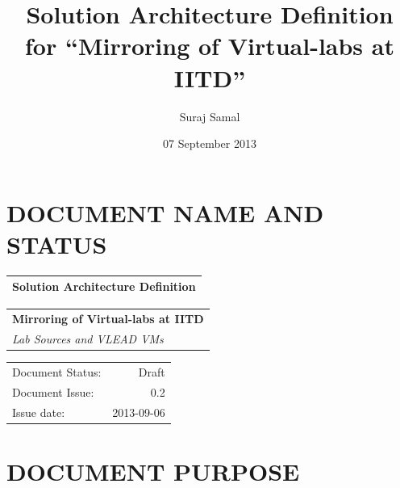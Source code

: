 \documentclass[11pt]{article}
\title{Solution Architecture Definition for ``Mirroring of Virtual-labs at IITD''}
\author{Suraj Samal}
\date{07 September 2013}
\begin{document}
\maketitle

\setcounter{tocdepth}{3}
\tableofcontents
\vspace*{1cm}

\listoftables
\listoffigures

\section{DOCUMENT NAME AND STATUS}
\label{sec-1}




\begin{center}
\begin{tabular}{l}
\hline
 Solution Architecture Definition  \\
\hline
\end{tabular}
\end{center}




\begin{center}
\begin{tabular}{l}
\hline
 \textbf{Mirroring of Virtual-labs at IITD}  \\
 \emph{Lab Sources and VLEAD VMs}            \\
\hline
\end{tabular}
\end{center}




\begin{center}
\begin{tabular}{lr}
\hline
 Document Status:  &       Draft  \\
 Document Issue:   &         0.2  \\
 Issue date:       &  2013-09-06  \\
\hline
\end{tabular}
\end{center}


                                      
\section{DOCUMENT PURPOSE}
\label{sec-2}
\end{document}
